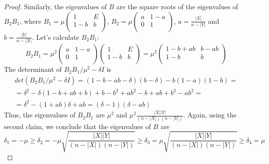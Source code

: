 \begin{problem}
\begin{sol}
\begin{proof}
            Similarly, the eigenvalues of $B$ are the square roots of the eigenvalues of $B_2 B_1$,
            where $B_1 = \mu
                \begin{pmatrix}
                    1     & E \\
                    1 - b & b \\
                \end{pmatrix}$, $B_2 = \mu
                \begin{pmatrix}
                    a & 1 - a \\
                    0 & 1     \\
                \end{pmatrix}$, $a = \frac{|X|}{n - |Y|}$ and $b = \frac{|Y|}{n - |X|}$.
            Let's calculate $B_2 B_1$:
            \[
                B_2 B_1 = \mu^2
                \begin{pmatrix}
                    a & 1 - a \\
                    0 & 1     \\
                \end{pmatrix}
                \begin{pmatrix}
                    1     & E \\
                    1 - b & b \\
                \end{pmatrix} = \mu^2
                \begin{pmatrix}
                    1 - b + ab & b - ab \\
                    1 - b      & b      \\
                \end{pmatrix}
            \]
            The determinant of $B_2 B_1 / \mu^2 - \delta I$ is
            \[
                \begin{gathered}
                    det(B_2 B_1 / \mu^2 - \delta I) = (1 - b - ab - \delta)(b - \delta) - b(1 - a)(1 - b) = \\
                    = \delta^2 - \delta (1 - b + ab + b) + b - b^2 + ab^2 - b + ab + b^2 - ab^2 = \\
                    = \delta^2 - (1 + ab)\delta + ab = (\delta - 1)(\delta - ab)
                \end{gathered}
            \]
            Thus, the eigenvalues of $B_2 B_1$ are $\mu^2$ and $\mu^2 \frac{|X| |Y|}{(n - |X|)(n - |Y|)}$.
            Again, using the second claim, we conclude that the eigenvalues of $B$ are
            \[
                \delta_1 = -\mu \geq \delta_2 = -\mu \sqrt{\frac{|X| |Y|}{(n - |X|)(n - |Y|)}} \geq \delta_3 = \mu \sqrt{\frac{|X| |Y|}{(n - |X|)(n - |Y|)}} \geq \delta_4 = \mu
            \]


\end{proof}
\end{sol}
\end{problem}
